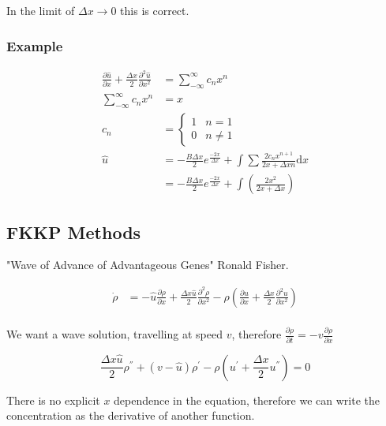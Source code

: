 \documentclass[a4paper]{article}
\begin{document}
In the limit of $\Delta x \rightarrow 0$ this is correct. 

\subsubsection*{Example}

\begin{align*}
 \frac{\partial \hat{u}}{\partial x} + \frac{\Delta x}{2} \frac{\partial ^2 \hat{u}}{\partial x^2} & = \sum _{- \infty} ^{\infty} c_n x^n \\ 
 \sum _{- \infty} ^{\infty} c_n x^n & = x \\
 c_n & =  \begin{cases}
1 & n = 1 \\
0 & n \neq 1		
\end{cases} \\
\hat{u} & =  - \frac{B \Delta x}{2} e^{\frac{-2 x}{\Delta x} } + \int \sum	 \frac{2 c_n x^{n+1}}{2x + \Delta x n } \mathrm{d} x \\
& = - \frac{B \Delta x}{2} e^{\frac{-2 x}{\Delta x} } + \int \left( \frac{2 x^2}{2 x + \Delta x} \right)
\end{align*}

\newpage

\subsection{FKKP Methods}

"Wave of Advance of Advantageous Genes" Ronald Fisher. 

\begin{align*}
\dot{\rho} & = - \hat{u} \frac{\partial \rho}{\partial x} + \frac{\Delta x \hat{u}}{2} \frac{\partial ^2 \rho}{\partial x ^2} - \rho \left(\frac{\partial u}{\partial x} + \frac{\Delta x}{2} \frac{\partial ^2 u}{\partial x ^2} \right) \\
\end{align*}

We want a wave solution, travelling at speed $v$, therefore $ \frac{\partial \rho}{\partial t}  = - v \frac{\partial \rho}{\partial x}$ 

\begin{equation}
\frac{\Delta x \hat{u}}{2} \rho ^{''} + ( v - \hat{u} ) \rho ^{'} - \rho \left( u^{'} + \frac{\Delta x}{2} u^{''} \right) = 0 
\end{equation} 

There is no explicit $x$ dependence in the equation, therefore we can write the concentration as the derivative of another function. 
\end{document}
